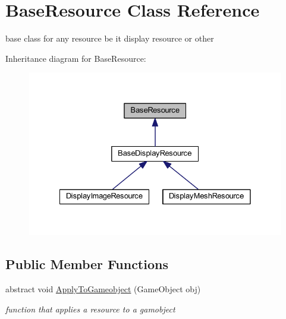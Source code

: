 \hypertarget{class_base_resource}{}\section{Base\+Resource Class Reference}
\label{class_base_resource}


base class for any resource be it display resource or other  




Inheritance diagram for Base\+Resource\+:
\nopagebreak
\begin{figure}[H]
\begin{center}
\leavevmode
\includegraphics[width=328pt]{class_base_resource__inherit__graph}
\end{center}
\end{figure}
\subsection*{Public Member Functions}
\begin{DoxyCompactItemize}
\item 
abstract void \mbox{\hyperlink{class_base_resource_a2d832c8042114da9e3f6240651d59703}{Apply\+To\+Gameobject}} (Game\+Object obj)
\begin{DoxyCompactList}\small\item\em function that applies a resource to a gamobject \end{DoxyCompactList}\end{DoxyCompactItemize}
